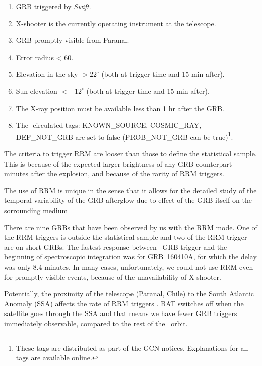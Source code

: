 \documentclass{aa}    %
\begin{document}
\begin{enumerate}
	\item GRB triggered by \textit{Swift}.
	\item X-shooter is the currently operating instrument at the telescope.
	\item GRB promptly visible from Paranal.
	\item Error radius < 60\arcsec.
	\item Elevation in the sky $> 22^\circ$ (both at trigger time and 15 min after).
	\item Sun elevation $< -12^\circ$ (both at trigger time and 15 min after).
	\item The X-ray position must be available less than 1 hr after the GRB.
	\item The \swift-circulated tags: KNOWN\_SOURCE, COSMIC\_RAY, DEF\_NOT\_GRB are set to false (PROB\_NOT\_GRB can be true)\footnote{These tags are distributed as part of the GCN notices. Explanations for all tags are \href{https://gcn.gsfc.nasa.gov/sock_pkt_def_doc.html}{available online}.}. 
\end{enumerate}

The criteria to trigger RRM are looser than those to define the statistical
sample. This is because of the expected larger brightness of any GRB counterpart
minutes after the explosion, and because of the rarity of RRM triggers.

The use of RRM is unique in the sense that it allows for the detailed study of
the temporal variability of the GRB afterglow due to effect of the GRB itself on
the sorrounding medium \citep[e.g., see][]{Dessauges-Zavadsky2006,
	Vreeswijk2007, DElia2009, Vreeswijk2013}

There are nine GRBs that have been observed by us with the RRM mode. One of the
RRM triggers is outside the statistical sample  and two of the RRM trigger are
on short GRBs. The fastest response between \swift~GRB trigger and the beginning
of spectroscopic integration was for GRB~160410A, for which the delay was only
8.4 minutes. In many cases, unfortunately, we could not use RRM even for promptly visible events, because of the unavailability of X-shooter.

Potentially, the proximity of the telescope (Paranal, Chile) to the South
Atlantic Anomaly (SSA) affects the rate of RRM triggers \citep{Greiner2011}. BAT
switches off when the satellite goes through the SSA and that means we have
fewer GRB triggers immediately observable, compared to the rest of
the \swift~orbit.
\end{document}
